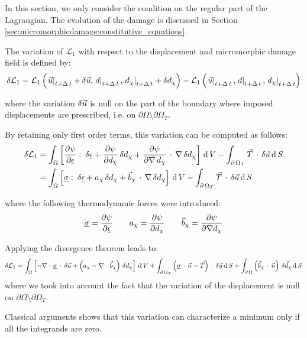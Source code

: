 In this section, we only consider the condition on the regular part of
the Lagrangian. The evolution of the damage is discussed in Section
\ref{sec:micromorphicdamage:constitutive_equations}.

The variation of \(\mathcal{L}_{1}\) with respect to the
displacement and micromorphic damage field is defined by:
\[
\delta \mathcal{L}_{1}=
\mathcal{L}_{1}\left(\left.\vec{u}\right|_{t+\Delta\,t}+\delta \vec{u},\left.d\right|_{t+\Delta\,t}, \left.d_{\chi}\right|_{t+\Delta\,t} + \delta d_{\chi}\right) - 
\mathcal{L}_{1}\left(\left.\vec{u}\right|_{t+\Delta\,t},\left.d\right|_{t+\Delta\,t}, \left.d_{\chi}\right|_{t+\Delta\,t}\right)
\]

where the variation \(\delta \vec{u}\) is null on the part of the
boundary where imposed displacements are prescribed, i.e. on
\(\partial\Omega\setminus\partial\Omega_{T}\).

By retaining only first order terms, this variation can be computed as follows:
\[
\begin{aligned}
\delta \mathcal{L}_{1}&=
\int_{\Omega}
\left[
\displaystyle \frac{\displaystyle \partial \psi}{\displaystyle \partial \underline{\epsilon}}\,\colon\,\delta \underline{\epsilon}+
\displaystyle \frac{\displaystyle \partial \psi}{\displaystyle \partial d_{\chi}}\,\delta d_{\chi}+
\displaystyle \frac{\displaystyle \partial \psi}{\displaystyle \partial \nabla\,d_{\chi}}\,\cdot\,\nabla\,\delta d_{\chi}
\right]
\,\mathrm{d}\,V -
\int_{\partial\,\Omega_{T}} \vec{T}\,\cdot\,\delta \vec{u} \,\mathrm{d}\,S \\
&=
\int_{\Omega}
\left[
\underline{\sigma}\,\colon\,\delta \underline{\epsilon}+
a_{\chi}\,\delta d_{\chi}+
\vec{b}_{\chi}\,\cdot\,\nabla\,\delta d_{\chi}
\right]
\,\mathrm{d}\,V -
\int_{\partial\,\Omega_{T}} \vec{T}\,\cdot\,\delta \vec{u} \,\mathrm{d}\,S \\
\end{aligned}
\]

where the following thermodynamic forces were introduced:
\[
\underline{\sigma}  = \displaystyle \frac{\displaystyle \partial \psi}{\displaystyle \partial \underline{\epsilon}} \quad\quad
a_{\chi} = \displaystyle \frac{\displaystyle \partial \psi}{\displaystyle \partial d_{\chi}} \quad\quad
\vec{b}_{\chi} = \displaystyle \frac{\displaystyle \partial \psi}{\displaystyle \partial \nabla d_{\chi}}
\]

Applying the divergence theorem leads to:
\[
\delta \mathcal{L}_{1}=
\int_{\Omega}
\left[
-\nabla \cdot\,\underline{\sigma}\,\cdot\,\delta \vec{u}+
  \left(a_{\chi}-\nabla \cdot\,\vec{b}_{\chi}\right)\,\delta d_{\chi} \right]
  \,\mathrm{d}\,V + \int_{\partial\,\Omega_{T}}
  \left(\underline{\sigma}\,\cdot\,\vec{n}-\vec{T}\right)\,\cdot\,\delta \vec{u}
  \,\mathrm{d}\,S + \int_{\partial\,\Omega}
  \left(\vec{b}_{\chi}\,\cdot\,\vec{n}\right)\,\delta \vec{d}_{\chi}
  \,\mathrm{d}\,S
\]
where we took into account the fact that the variation of the
displacement is null on \(\partial\Omega\setminus\partial\Omega_{T}\).

Classical arguments shows that this variation can characterize a
minimum only if all the integrands are zero.

